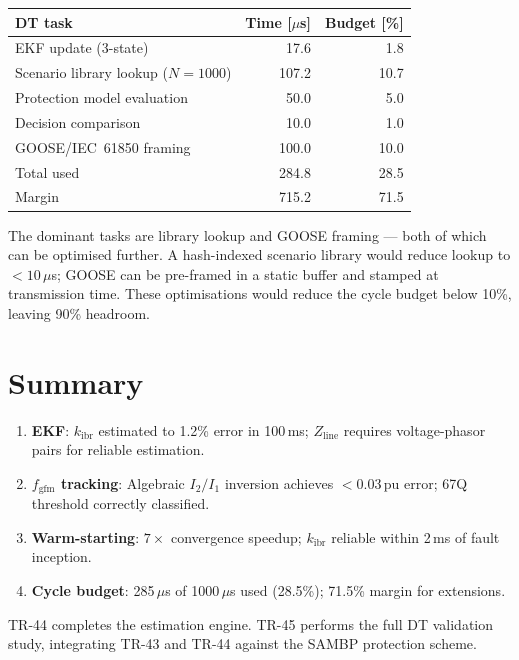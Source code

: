\documentclass[11pt,a4paper]{article}
\begin{document}
\begin{center}
\begin{tabular}{@{}lrr@{}}
\toprule
DT task & Time [$\mu$s] & Budget [\%] \\
\midrule
EKF update (3-state) & 17.6 & 1.8 \\
Scenario library lookup ($N=1000$) & 107.2 & 10.7 \\
Protection model evaluation & 50.0 & 5.0 \\
Decision comparison & 10.0 & 1.0 \\
GOOSE/IEC~61850 framing & 100.0 & 10.0 \\
\midrule
Total used & 284.8 & 28.5 \\
Margin & 715.2 & 71.5 \\
\bottomrule
\end{tabular}
\end{center}

\medskip\noindent
The dominant tasks are library lookup and GOOSE framing --- both of which can
be optimised further.  A hash-indexed scenario library would reduce lookup
to $<10\,\mu$s; GOOSE can be pre-framed in a static buffer and stamped at
transmission time.  These optimisations would reduce the cycle budget below
10\%, leaving 90\% headroom.

\section{Summary}
\label{sec:summary}

\begin{enumerate}
  \item \textbf{EKF}: $k_\mathrm{ibr}$ estimated to 1.2\% error in 100\,ms;
    $Z_\mathrm{line}$ requires voltage-phasor pairs for reliable estimation.

  \item \textbf{$f_\mathrm{gfm}$ tracking}: Algebraic $I_2/I_1$ inversion
    achieves $<0.03$\,pu error; 67Q threshold correctly classified.

  \item \textbf{Warm-starting}: $7\times$ convergence speedup; $k_\mathrm{ibr}$
    reliable within 2\,ms of fault inception.

  \item \textbf{Cycle budget}: 285\,$\mu$s of 1000\,$\mu$s used (28.5\%);
    71.5\% margin for extensions.
\end{enumerate}

\noindent
TR-44 completes the estimation engine.  TR-45 performs the full DT validation
study, integrating TR-43 and TR-44 against the SAMBP protection scheme.



\end{document}
